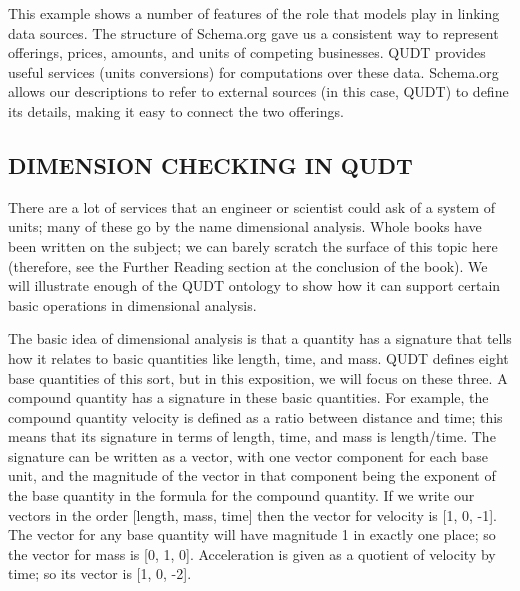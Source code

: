 This example shows a number of features of the role that models play in
linking data sources. The structure of Schema.org gave
us a consistent way to represent offerings, prices, amounts, and units
of competing businesses. QUDT provides useful services (units
conversions) for computations over these data. Schema.org allows our 
descriptions to refer to external sources (in this case, QUDT) to define
its details, making it easy to connect the two offerings. 

\subsection{DIMENSION CHECKING IN QUDT}

There are a lot of services that an engineer or scientist could ask of a
system of units; many of these go by the name dimensional analysis.
Whole books have been written on the subject; we can barely scratch the
surface of this topic here (therefore, see the Further Reading section
at the conclusion of the book). We will illustrate enough of the QUDT
ontology to show how it can support certain basic operations in
dimensional analysis.

The basic idea of dimensional analysis is that a quantity has a
signature that tells how it relates to
basic quantities like length, time, and mass. QUDT defines eight base
quantities of this sort, but in this exposition, we will focus on these
three. A compound quantity has a signature in these basic quantities.
For example, the compound quantity velocity is defined as a ratio
between distance and time; this means that its signature in terms of
length, time, and mass is length/time. The signature can be written as a
vector, with one vector component for each base unit, and the magnitude
of the vector in that component being the exponent of the base quantity
in the formula for the compound quantity. If we write our vectors in the
order {[}length, mass, time{]} then the vector for velocity is {[}1, 0,
-1{]}. The vector for any base quantity will have magnitude 1 in exactly
one place; so the vector for mass is {[}0, 1, 0{]}. Acceleration is
given as a quotient of velocity by time; so its vector is {[}1, 0,
-2{]}.

